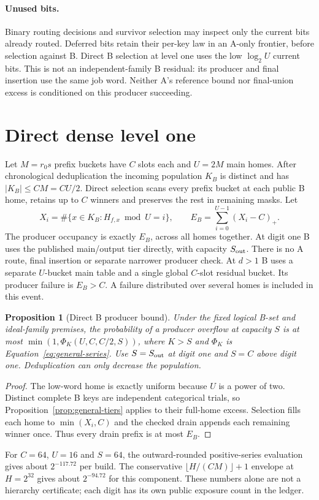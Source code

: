 \documentclass[11pt]{article}
\newtheorem{proposition}[theorem]{Proposition}
\theoremstyle{definition}
\theoremstyle{remark}
\begin{document}
\paragraph{Unused bits.}
\label{prop:native-frontiers}
Binary routing decisions and survivor selection may inspect only the current
bits already routed. Deferred bits retain their per-key law in an A-only
frontier, before selection against B. Direct B selection at level one uses
the low $\log_2U$ current bits. This is not an independent-family B residual:
its producer and final insertion use the same job word. Neither A's reference
bound nor final-union excess is conditioned on this producer succeeding.

\section{Direct dense level one}
\label{sec:level-one-completion}\label{sec:worked-configuration}
Let $M=r_0s$ prefix buckets have $C$ slots each and $U=2M$ main homes.
After chronological deduplication the incoming population $K_B$ is distinct
and has $|K_B|\le CM=CU/2$. Direct selection scans every prefix bucket at
each public B home, retains up to $C$ winners and preserves the rest in
remaining masks. Let
\[
 X_i=\#\{x\in K_B:H_{f,x}\bmod U=i\},\qquad
 E_B=\sum_{i=0}^{U-1}(X_i-C)_+.
\]
The producer occupancy is exactly $E_B$, across all homes together.
At digit one B uses the published main/output tier directly, with capacity
$S_{\rm out}$. There is no A route, final insertion or separate narrower
producer check. At $d>1$ B uses a separate $U$-bucket main table and a
single global $C$-slot residual bucket. Its producer failure is $E_B>C$.
A failure distributed over several homes is included in this event.

\begin{proposition}[Direct B producer bound]
\label{prop:dense-producer}
Under the fixed logical B-set and ideal-family premises, the probability
of a producer overflow at capacity $S$ is at most
$\min(1,\Phi_K(U,C,C/2,S))$, where $K>S$ and $\Phi_K$ is
Equation~\eqref{eq:general-series}. Use $S=S_{\rm out}$ at digit one and
$S=C$ above digit one. Deduplication can only decrease the population.
\end{proposition}
\begin{proof}
The low-word home is exactly uniform because $U$ is a power of two.
Distinct complete B keys are independent categorical trials, so
Proposition~\ref{prop:general-tiers} applies to their full-home excess.
Selection fills each home to $\min(X_i,C)$ and the checked drain appends
each remaining winner once. Thus every drain prefix is at most $E_B$.
\end{proof}
For $C=64$, $U=16$ and $S=64$, the outward-rounded positive-series
evaluation gives about $2^{-117.72}$ per build. The conservative
$\lfloor H/(CM)\rfloor+1$ envelope at $H=2^{32}$ gives about
$2^{-94.72}$ for this component. These numbers alone are not a hierarchy
certificate; each digit has its own public exposure count in the ledger.
\end{document}
